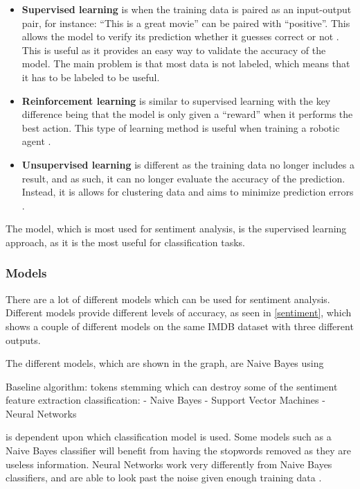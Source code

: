 \begin{itemize}
  \item \textbf{Supervised learning} is when the training data is paired as an
  input-output pair, for instance: ``This is a great movie''
  can be paired with ``positive''. This allows the model to verify its prediction
  whether it guesses correct or not \citep[Ch. 7.0]{MIBook}\KT. This is useful
  as it provides an easy way to validate the accuracy of the model. The main problem
  is that most data is not labeled, which means that it has to be labeled to be
  useful.
  \item \textbf{Reinforcement learning} is similar to supervised learning with
  the key difference being that the model is only given a ``reward'' when it
  performs the best action. This type of learning method is useful when
  training a robotic agent \citep{Reinforcement}.
  \item \textbf{Unsupervised learning} is different as the training data no
  longer includes a result, and as such, it can no longer evaluate the accuracy
  of the prediction. Instead, it is allows for clustering data and aims to
  minimize prediction errors \citep[Ch. 11.1]{MIBook}\KT.
\end{itemize}

The model, which is most used for sentiment analysis, is the supervised learning
approach, as it is the most useful for classification tasks.

\subsubsection{Models}\label{subsub:Models}

There are a lot of different models which can be used for sentiment analysis. 
Different models provide different levels of accuracy, as seen in
\autoref{sentiment}, which shows a couple of different models on the same IMDB
dataset with three different outputs\citep{Classification}.


The different models, which are shown in the graph, are Naive Bayes using 

Baseline algorithm:
tokens
stemming which can destroy some of the sentiment
feature extraction
classification:
- Naive Bayes
- Support Vector Machines
- Neural Networks



 is dependent upon which classification model is used. Some models
such as a Naive Bayes classifier will benefit from having the stopwords removed
as they are useless information. Neural Networks work very differently from
Naive Bayes classifiers, and are able to look past the noise given enough
training data \Source.\nl